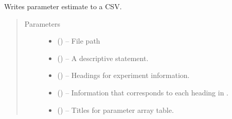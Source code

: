 \documentclass[letterpaper,10pt,english]{sphinxmanual}
\begin{document}

\begin{fulllineitems}
\label{\detokenize{references/write:nmrespy.write._write_csv}}
\sphinxAtStartPar
Writes parameter estimate to a CSV.
\begin{quote}\begin{description}
\item[{Parameters}] \leavevmode\begin{itemize}
\item {} 
\sphinxAtStartPar
{} () – File path

\item {} 
\sphinxAtStartPar
{} (\sphinxstyleliteralemphasis{\sphinxupquote{, }}) – A descriptive statement.

\item {} 
\sphinxAtStartPar
{} (\sphinxstyleliteralemphasis{\sphinxupquote{, }}) – Headings for experiment information.

\item {} 
\sphinxAtStartPar
{} (\sphinxstyleliteralemphasis{\sphinxupquote{, }}) – Information that corresponds to each heading in .

\item {} 
\sphinxAtStartPar
{} () – Titles for parameter array table.


\end{itemize}
\end{description}
\end{quote}
\end{fulllineitems}
\end{document}
